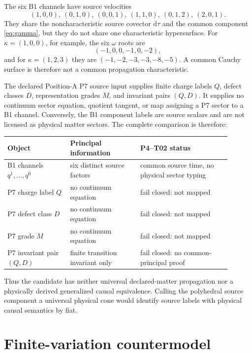 \documentclass[11pt]{article}
\newcommand{\dd}{\mathrm d}
\begin{document}
The six B1 channels have source velocities
\begin{equation}
 (1,0,0),\ (0,1,0),\ (0,0,1),\ (1,1,0),\ (0,1,2),\ (2,0,1).
 \label{eq:velocities}
\end{equation}
They share the noncharacteristic source covector $\dd\tau$ and the common
component \eqref{eq:gamma}, but they do not share one characteristic
hypersurface.  For $\kappa=(1,0,0)$, for example, the six $\omega$ roots are
\begin{equation}
 (-1,0,0,-1,0,-2),
\end{equation}
and for $\kappa=(1,2,3)$ they are
$(-1,-2,-3,-3,-8,-5)$.  A common Cauchy surface is therefore not a common
propagation characteristic.

The declared Position-A P7 source input supplies finite charge labels $Q$,
defect classes $D$, representation grades $M$, and invariant pairs $(Q,D)$.
It supplies no continuum sector equation, quotient tangent, or map assigning a
P7 sector to a B1 channel.  Conversely, the B1 component labels are source
scalars and are not licensed as physical matter sectors.  The complete
comparison is therefore:
\begin{center}
\small
\begin{tabular}{p{0.25\linewidth}p{0.29\linewidth}p{0.36\linewidth}}
\toprule
Object & Principal information & P4--T02 status\\
\midrule
B1 channels $q^1,\ldots,q^6$ & six distinct source factors & common source time, no physical sector typing\\
P7 charge label $Q$ & no continuum equation & fail closed: not mapped\\
P7 defect class $D$ & no continuum equation & fail closed: not mapped\\
P7 grade $M$ & no continuum equation & fail closed: not mapped\\
P7 invariant pair $(Q,D)$ & finite transition invariant only & fail closed: no common-principal proof\\
\bottomrule
\end{tabular}
\end{center}
Thus the candidate has neither universal declared-matter propagation nor a
physically derived generalized causal equivalence.  Calling the polyhedral
source component a universal physical cone would identify source labels with
physical causal semantics by fiat.

\section{Finite-variation countermodel}
\end{document}
